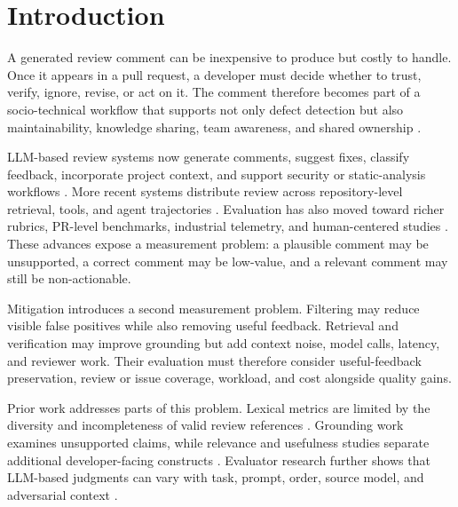 \documentclass[10pt]{article}
\begin{document}

\section{Introduction}

A generated review comment can be inexpensive to produce but costly to handle. Once it appears in a pull request, a developer must decide whether to trust, verify, ignore, revise, or act on it. The comment therefore becomes part of a socio-technical workflow that supports not only defect detection but also maintainability, knowledge sharing, team awareness, and shared ownership \cite{p37_sadowski2018_google_mcr,p38_bacchelli2013_expectations_mcr,p39_bosu2015_useful_reviews,p51_davila2021_mcr_slr_taxonomy}.

LLM-based review systems now generate comments, suggest fixes, classify feedback, incorporate project context, and support security or static-analysis workflows \cite{p14_li2022_codereviewer,p19_nguyen2025_fine_grained_classification,p21_peng2025_icodereviewer,p22_jaoua2025_static_analyzers}. More recent systems distribute review across repository-level retrieval, tools, and agent trajectories \cite{p74_charoenwet2026_agentic_code_review_in_the_ter,p76_wang2026_swe_review_closing_the_loop_on,p85_zhang2026_reporeviewer_a_local_first_mul}. Evaluation has also moved toward richer rubrics, PR-level benchmarks, industrial telemetry, and human-centered studies \cite{p01_lu2025_deepcrceval,p03_tantithamthavorn2026_rovodev,p04_kumar2026_swe_prbench,p07_olewicki2024_revmate,p54_pereira2026_crbench}. These advances expose a measurement problem: a plausible comment may be unsupported, a correct comment may be low-value, and a relevant comment may still be non-actionable.

Mitigation introduces a second measurement problem. Filtering may reduce visible false positives while also removing useful feedback. Retrieval and verification may improve grounding but add context noise, model calls, latency, and reviewer work. Their evaluation must therefore consider useful-feedback preservation, review or issue coverage, workload, and cost alongside quality gains.

Prior work addresses parts of this problem. Lexical metrics are limited by the diversity and incompleteness of valid review references \cite{p01_lu2025_deepcrceval,p14_li2022_codereviewer,p18_bensghaier2025_curated_reviews,p69_jiang2025_deep_assessment_crg}. Grounding work examines unsupported claims, while relevance and usefulness studies separate additional developer-facing constructs \cite{p02_tantithamthavorn2026_hallujudge,p57_heumuller2025_relevance_reviews,p60_ahmed2025_feedback_useful}. Evaluator research further shows that LLM-based judgments can vary with task, prompt, order, source model, and adversarial context \cite{p29_wang2025_human_evaluators,p31_jiang2025_codejudgebench,p32_zhao2026_bias_loop,p63_mitropoulos2026_confirmation_bias,p64_thornton2026_adversarial_comments}.
\end{document}
